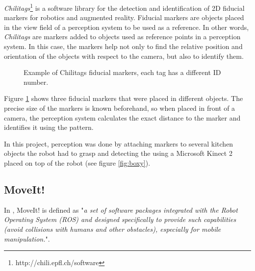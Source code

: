 \textit{Chilitags}\footnote{http://chili.epfl.ch/software} is a software library for the detection and identification of 2D fiducial markers for robotics and augmented reality. Fiducial markers are objects placed in the view field of a perception system to be used as a reference. In other words, \textit{Chilitags} are markers added to objects used as reference points in a perception system. In this case, the markers help not only to find the relative position and orientation of the objects with respect to the camera, but also to identify them.
\begin{figure}[H]
	\centering \vspace{-10pt}
	\begin{subfigure}[][Tag 0]
		{\texttt{[image: 0.png]}}
	\end{subfigure}
	\begin{subfigure}[][Tag 1]
		{\texttt{[image: 1.png]}}
	\end{subfigure}
	\begin{subfigure}[][Tag 2]
		{\texttt{[image: 2.png]}}
	\end{subfigure}
	\vspace{-10pt}
	\caption[Example of Chilitags fiducial markers]{Example of Chilitags fiducial markers, each tag has a different ID number.}
	\vspace{-10pt}
	\label{fig:chilitag}
\end{figure}

Figure \ref{fig:chilitag} shows three fiducial markers that were placed in different objects. The precise size of the markers is known beforehand, so when placed in front of a camera, the perception system calculates the exact distance to the marker and identifies it using the pattern.

In this project, perception was done by attaching markers to several kitchen objects the robot had to grasp and detecting the using a Microsoft Kinect 2 placed on top of the robot (see figure \ref{fig:boxy}).

\subsection{MoveIt!}
\label{subsec:moveit}


In \citet{moveit}, MoveIt! is defined as "\textit{a set of software	packages integrated with the Robot Operating System (ROS) and designed specifically to provide such capabilities (avoid collisions with humans and other obstacles), especially for mobile manipulation.}".

